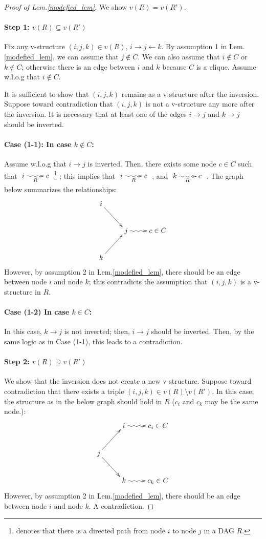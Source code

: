 \documentclass[11pt,a4paper,dvipdfmx]{article}
\theoremstyle{plain}
\begin{document}
\newpage
\begin{proof}[Proof of Lem.\ref{modefied_lem}]
	We show $v(R) = v(R')$.
	
	\paragraph{Step 1: $v(R) \subseteq v(R')$}
	Fix any v-structure $(i,j,k) \in v(R)$, $i \to j \leftarrow k$.
	By assumption 1 in Lem.\ref{modefied_lem}, we can assume that $j \notin C$.
	We can also assume that $i \notin C$ or $k \notin C$; otherwise there is an edge between $i$ and $k$ because $C$ is a clique. Assume w.l.o.g that $i \notin C$.
	
	It is sufficient to show that $(i,j,k)$ remains as a v-structure after the inversion. 
	Suppose toward contradiction that $(i,j,k)$ is not a v-structure any more after the inversion. It is necessary that at least one of the edges $i \to j$ and $k \to j$ should be inverted.
	\paragraph{Case (1-1): In case $k \notin C$:}
	Assume w.l.o.g that $i \to j$ is inverted. Then, there exists some node $c \in C$ such that 
	$
	\xymatrix{i \ar@{~>}[r]_R& c}
	$
	\footnote{
	 denotes that there is a directed path from node $i$ to node $j$ in a DAG $R$.
	}
	; this implies that 
	$
	\xymatrix{i \ar@{~>}[r]_R& c}
	$
	, and
	$
	\xymatrix{k \ar@{~>}[r]_R& c}
	$
	. The graph below summarizes the relationships:
	\[
	\xymatrix{
		  i \ar[rd] & \\
		  & j \ar@{~>}[r] & c \in C\\
		  k \ar[ru] &
	}
	\]
	However, by assumption 2 in Lem.\ref{modefied_lem}, there should be an edge  between node $i$ and node $k$; this contradicts the assumption that $(i,j,k)$ is a v-structure in $R$.
	
	\paragraph{Case (1-2) In case $k \in C$:}
	In this case, $k \to j$ is not inverted; then, $i \to j$ should be inverted. Then, by the same logic as in Case (1-1), this leads to a contradiction.
	
	\paragraph{Step 2: $v(R) \supseteq v(R')$}
	We show that the inversion does not create a new v-structure.
	Suppose toward contradiction that there exists a triple $(i,j,k) \in v(R) \setminus v(R')$. In this case, the structure as in the below graph should hold in $R$ ($c_i$ and $c_k$ may be the same node.):
	\[
	\xymatrix{
		    & i \ar@{~>}[r] & c_i \in C\\
		  j \ar[ru] \ar[rd] &   &\\
		    & k \ar@{~>}[r] & c_k \in C
	}
	\]
	However, by assumption 2 in Lem.\ref{modefied_lem}, there should be an edge  between node $i$ and node $k$. A contradiction.
\end{proof}
\end{document}
